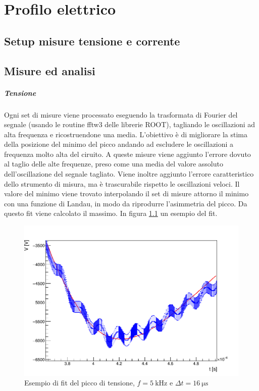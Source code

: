 \chapter{Profilo elettrico}

\section{Setup misure tensione e corrente}

\section{Misure ed analisi}
\paragraph{Tensione} Ogni set di misure viene processato eseguendo la trasformata di Fourier del segnale (usando le routine fftw3 delle librerie ROOT), tagliando le oscillazioni ad alta frequenza e ricostruendone una media. L'obiettivo è di migliorare la stima della posizione del minimo del picco andando ad escludere le oscillazioni a frequenza molto alta del ciruito.
A queste misure viene aggiunto l'errore dovuto al taglio delle alte frequenze, preso come una media del valore assoluto dell'oscillazione del segnale tagliato. Viene inoltre aggiunto l'errore caratteristico dello strumento di misura, ma è trascurabile rispetto le oscillazioni veloci.
Il valore del minimo viene trovato interpolando il set di misure attorno il minimo con una funzione di Landau, in modo da riprodurre l'asimmetria del picco. Da questo fit viene calcolato il massimo.
In figura \ref{fig:landau} un esempio del fit.

\begin{figure}
\centering
\includegraphics[width=.6\textwidth]{Immagini/esfiterr.png}
\caption{Esempio di fit del picco di tensione, $f = \SI{5}{\kilo\hertz}$ e $\Delta t = \SI{16}{\micro\second}$}
\label{fig:landau}
\end{figure}


